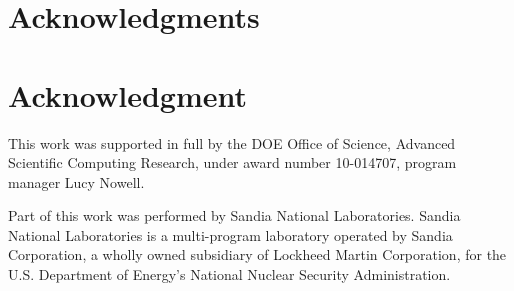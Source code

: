 \documentclass[10pt,journal,cspaper,compsoc]{IEEEtran}
\begin{document}

%


\appendices


\ifCLASSOPTIONcompsoc
  \section*{Acknowledgments}
\else
  \section*{Acknowledgment}
\fi


This work was supported in full by the DOE Office of Science, Advanced Scientific Computing Research, under award number 10-014707, program manager Lucy Nowell.

Part of this work was performed by Sandia National Laboratories.  Sandia National Laboratories is a multi-program laboratory operated by Sandia Corporation, a wholly owned subsidiary of Lockheed Martin Corporation, for the U.S. Department of Energy's National Nuclear Security Administration.
\end{document}
